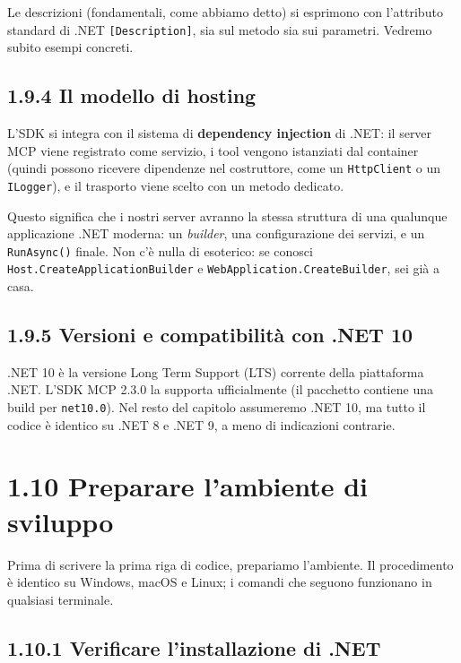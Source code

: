 \documentclass[
  italian,
  10pt,
]{book}
\begin{document}
Le descrizioni (fondamentali, come abbiamo detto) si esprimono con
l'attributo standard di .NET \texttt{{[}Description{]}}, sia sul metodo
sia sui parametri. Vedremo subito esempi concreti.

\subsection{1.9.4 Il modello di hosting}\label{il-modello-di-hosting}

L'SDK si integra con il sistema di \textbf{dependency injection} di
.NET: il server MCP viene registrato come servizio, i tool vengono
istanziati dal container (quindi possono ricevere dipendenze nel
costruttore, come un \texttt{HttpClient} o un \texttt{ILogger}), e il
trasporto viene scelto con un metodo dedicato.

Questo significa che i nostri server avranno la stessa struttura di una
qualunque applicazione .NET moderna: un \emph{builder}, una
configurazione dei servizi, e un \texttt{RunAsync()} finale. Non c'è
nulla di esoterico: se conosci \texttt{Host.CreateApplicationBuilder} e
\texttt{WebApplication.CreateBuilder}, sei già a casa.

\subsection{1.9.5 Versioni e compatibilità con .NET
10}\label{versioni-e-compatibilituxe0-con-.net-10}

.NET 10 è la versione Long Term Support (LTS) corrente della piattaforma
.NET. L'SDK MCP 2.3.0 la supporta ufficialmente (il pacchetto contiene
una build per \texttt{net10.0}). Nel resto del capitolo assumeremo .NET
10, ma tutto il codice è identico su .NET 8 e .NET 9, a meno di
indicazioni contrarie.

\section{1.10 Preparare l'ambiente di
sviluppo}\label{preparare-lambiente-di-sviluppo}

Prima di scrivere la prima riga di codice, prepariamo l'ambiente. Il
procedimento è identico su Windows, macOS e Linux; i comandi che seguono
funzionano in qualsiasi terminale.

\subsection{1.10.1 Verificare l'installazione di
.NET}\label{verificare-linstallazione-di-.net}
\end{document}
